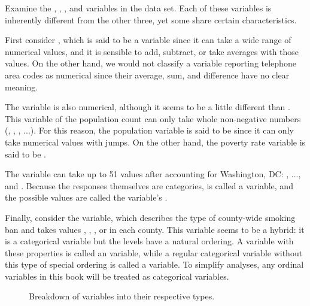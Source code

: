Examine the , , ,
and  variables in the 
data set. Each of these variables is inherently different from the
other three, yet some share certain characteristics.

First consider ,
which is said to be a  variable since
it can take a wide range of numerical values,
and it is sensible to add, subtract, or take averages
with those values.
On the other hand, we would not classify a variable
reporting telephone area codes as numerical since their
average, sum, and difference have no clear meaning.

The  variable is also numerical, although it seems
to be a little different than .
This variable of the population count can only take whole
non-negative numbers (, , , ...).
For this reason, the population variable is said to be
 since it can only take numerical values
with jumps.
On the other hand, the poverty rate variable is said
to be .

The variable  can take up to 51 values after
accounting for Washington, DC: , ..., and .
Because the responses themselves are categories,
 is called a  variable,
and the possible values are called the variable's .

Finally, consider the  variable,
which describes the type of county-wide smoking ban and takes values
, ,
, or 
in each county.
This variable seems to be a hybrid: it is a categorical variable
but the levels have a natural ordering.
A variable with these properties is called an 
variable, while a regular categorical variable without this
type of special ordering is called a  variable.
To simplify analyses, any ordinal variables in this book will
be treated as categorical variables.

\begin{figure}
  \centering
  \caption{Breakdown of variables into their respective types.}
  \label{variables}
\end{figure}

